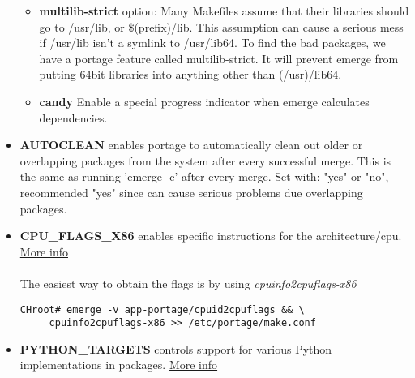 \documentclass[11pt,a4paper]{article}
\begin{document}
\begin{itemize}
\begin{itemize}[label={o}]
                            \item \textbf{multilib-strict} option: Many Makefiles assume that their libraries should go to /usr/lib, or \$(prefix)/lib. This assumption can cause a serious mess if /usr/lib isn't a symlink to /usr/lib64. To find the bad packages, we have a portage feature called multilib-strict. It will prevent emerge from putting 64bit libraries into anything other than (/usr)/lib64.

                            \item \textbf{candy} Enable a special progress indicator when emerge calculates dependencies.

                        \end{itemize}

                    \item \textbf{AUTOCLEAN} enables portage to automatically clean out older or overlapping packages from the system after every successful merge. This is the same as running 'emerge -c' after every merge. Set with: "yes" or "no", recommended "yes" since can cause serious problems due overlapping packages.

                        

                    \item \textbf{CPU\_FLAGS\_X86} enables specific instructions for the architecture/cpu. \href{https://wiki.gentoo.org/wiki/CPU_FLAGS_X86}{More info}

                        

                        \paragraph{} The easiest way to obtain the flags is by using \textit{cpuinfo2cpuflags-x86}

                        \begin{lstlisting}[style=BashInputCHRoot]
 CHroot# emerge -v app-portage/cpuid2cpuflags && \
     cpuinfo2cpuflags-x86 >> /etc/portage/make.conf
                        \end{lstlisting}

                    \item \textbf{PYTHON\_TARGETS} controls support for various Python implementations in packages. \href{https://wiki.gentoo.org/wiki/Project:Python/PYTHON_TARGETS}{More info}


\end{itemize}
\end{document}
